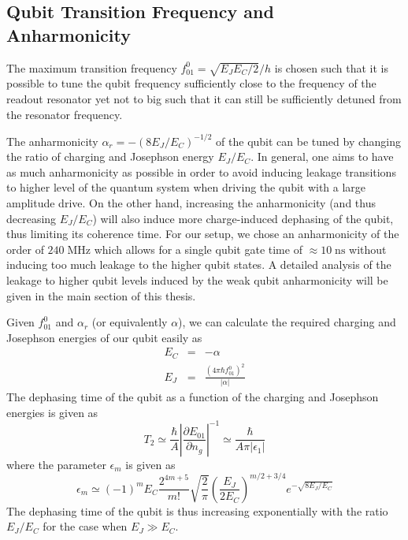 \subsection{Qubit Transition Frequency and Anharmonicity}

The maximum transition frequency $f_{01}^0 = \sqrt{E_J E_C/2}/h$  is chosen such that it is possible to tune the qubit frequency sufficiently close to the frequency of the readout resonator yet not to big such that it can still be sufficiently detuned from the resonator frequency.

\smallskip

The anharmonicity $\alpha_r=-(8E_J/E_C)^{-1/2}$ of the qubit can be tuned by changing the ratio of charging and Josephson energy $E_J/E_C$. In general, one aims to have as much anharmonicity as possible in order to avoid inducing leakage transitions to higher level of the quantum system when driving the qubit with a large amplitude drive. On the other hand, increasing the anharmonicity (and thus decreasing $E_J/E_C$) will also induce more charge-induced dephasing of the qubit, thus limiting its coherence time. For our setup, we chose an anharmonicity of the order of $240\;\mathrm{MHz}$ which allows for a single qubit gate time of $\approx 10 \;\mathrm{ns}$ without inducing too much leakage to the higher qubit states. A detailed analysis of the leakage to higher qubit levels induced by the weak qubit anharmonicity will be given in the main section of this thesis.

\smallskip

Given $f_{01}^0$ and $\alpha_r$ (or equivalently $\alpha$), we can calculate the required charging and Josephson energies of our qubit easily as
%
\begin{eqnarray}
E_C & = & -\alpha \\
E_J & = & \frac{(4\pi\hbar f_{01}^0)^2}{|\alpha|}
\end{eqnarray}
%
The dephasing time of the qubit as a function of the charging and Josephson energies is given as \citep{koch_charge-insensitive_2007}
%
\begin{equation}
T_2 \simeq \frac{\hbar}{A}\left|\frac{\partial E_{01}}{\partial n_g}\right|^{-1} \simeq \frac{\hbar}{A\pi |\epsilon_1|}
\end{equation}
%
where the parameter $\epsilon_m$ is given as
%
\begin{equation}
\epsilon_m \simeq (-1)^m E_C \frac{2^{4m+5}}{m!}\sqrt{\frac{2}{\pi}}\left(\frac{E_J}{2E_C}\right)^{m/2+3/4}e^{-\sqrt{8 E_J / E_C}}
\end{equation}
%
The dephasing time of the qubit is thus increasing exponentially with the ratio $E_J/E_C$ for the case when $E_J \gg E_C$.
